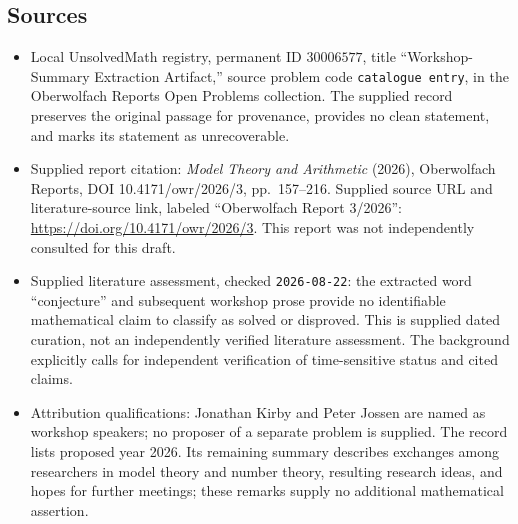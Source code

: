 \documentclass[11pt]{article}
\begin{document}
\subsection{Sources}
\begin{itemize}
\item Local UnsolvedMath registry, permanent ID \(30006577\), title ``Workshop-Summary Extraction Artifact,'' source problem code \texttt{catalogue entry}, in the Oberwolfach Reports Open Problems collection. The supplied record preserves the original passage for provenance, provides no clean statement, and marks its statement as unrecoverable.
\item Supplied report citation: \emph{Model Theory and Arithmetic} (2026), Oberwolfach Reports, DOI 10.4171/owr/2026/3, pp.\ 157--216. Supplied source URL and literature-source link, labeled ``Oberwolfach Report 3/2026'': \url{https://doi.org/10.4171/owr/2026/3}. This report was not independently consulted for this draft.
\item Supplied literature assessment, checked \texttt{2026-08-22}: the extracted word ``conjecture'' and subsequent workshop prose provide no identifiable mathematical claim to classify as solved or disproved. This is supplied dated curation, not an independently verified literature assessment. The background explicitly calls for independent verification of time-sensitive status and cited claims.
\item Attribution qualifications: Jonathan Kirby and Peter Jossen are named as workshop speakers; no proposer of a separate problem is supplied. The record lists proposed year 2026. Its remaining summary describes exchanges among researchers in model theory and number theory, resulting research ideas, and hopes for further meetings; these remarks supply no additional mathematical assertion.
\end{itemize}
\end{document}
